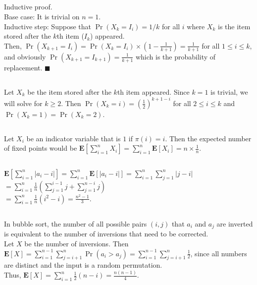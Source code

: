 \documentclass{article}
\begin{document}
\subsection{}
Inductive proof.\\
Base case: It is trivial on $n=1$.\\
Inductive step: Suppose that $\Pr(X_k=I_i)=1/k$ for all $i$ where $X_k$ is the item stored after the $k$th item ($I_k$) appeared.\\
Then, $\Pr(X_{k+1}=I_i)=\Pr(X_k=I_i)\times(1-\frac{1}{k+1})=\frac{1}{k+1}$ for all $1\leq i \leq k$, and obviously $\Pr(X_{k+1}=I_{k+1})=\frac{1}{k+1}$ which is the probability of replacement. $\blacksquare$
\subsection{}
Let $X_k$ be the item stored after the $k$th item appeared. Since $k=1$ is trivial, we will solve for $k\geq 2$.
Then $\Pr(X_k=i)=(\frac{1}{2})^{k+1-i}$ for all $2\leq i\leq k$ and $\Pr(X_k=1)=\Pr(X_k=2)$.
\subsection{}
Let $X_i$ be an indicator variable that is $1$ if $\pi(i)=i$.
Then the expected number of fixed points would be $\textbf{E}[\sum\limits_{i=1}^nX_i]=\sum\limits_{i=1}^n\textbf{E}[X_i]=n\times\frac{1}{n}$.
\subsection{}
$\textbf{E}[\sum\limits_{i=1}^{n} |a_i -i|] = \sum\limits_{i=1}^{n} \textbf{E}[|a_i - i|]=\sum\limits_{i=1}^n\sum\limits_{j=1}^n|j-i|$
$=\sum\limits_{i=1}^n\frac{1}{n}(\sum\limits_{j=1}^{i-1}j+\sum\limits_{j=1}^{n-i}j)$\\
$=\sum\limits_{i=1}^n\frac{1}{n}(i^2-i)=\frac{n^2-1}{3}$.
\subsection{}
In bubble sort, the number of all possible pairs $(i,j)$ that $a_i$ and $a_j$ are inverted is equivalent to the number of inversions that need to be corrected.\\
Let $X$ be the number of inversions.
Then $\textbf{E}[X]=\sum\limits_{i=1}^{n-1}\sum\limits_{j=i+1}^n\Pr(a_i>a_j)=\sum\limits_{i=1}^{n-1}\sum\limits_{j=i+1}^n\frac{1}{2}$,
since all numbers are distinct and the input is a random permutation.\\
Thus, $\textbf{E}[X]=\sum\limits_{i=1}^n\frac{1}{2}(n-i)=\frac{n(n-1)}{4}$.
\end{document}
